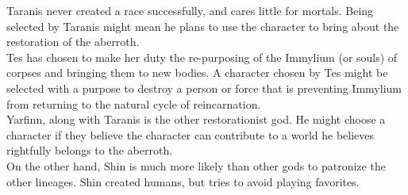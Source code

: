 Taranis never created a race successfully, and cares little for mortals. Being selected by Taranis might mean he plans to use the character to bring about the restoration of the aberroth.\\
Tes has chosen to make her duty the re-purposing of the Immylium (or souls) of corpses and bringing them to new bodies. A character chosen by Tes might be selected with a purpose to destroy a person or force that is preventing Immylium from returning to the natural cycle of reincarnation.\\
Yarfinn, along with Taranis is the other restorationist god. He might choose a character if they believe the character can contribute to a world he believes rightfully belongs to the aberroth.\\
On the other hand, Shin is much more likely than other gods to patronize the other lineages. Shin created humans, but tries to avoid playing favorites.\\
